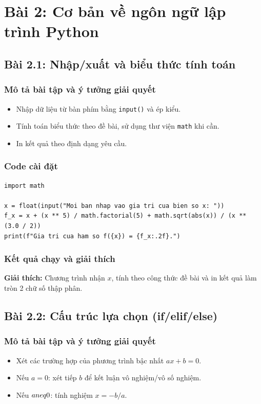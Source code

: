 \chapter{Bài 2: Cơ bản về ngôn ngữ lập trình Python}


\section{Bài 2.1: Nhập/xuất và biểu thức tính toán}
\subsection{Mô tả bài tập và ý tưởng giải quyết}
\begin{itemize}
  \item Nhập dữ liệu từ bàn phím bằng \texttt{input()} và ép kiểu.
  \item Tính toán biểu thức theo đề bài, sử dụng thư viện \texttt{math} khi cần.
  \item In kết quả theo định dạng yêu cầu.
\end{itemize}

\subsection{Code cài đặt}
\begin{lstlisting}
import math

x = float(input("Moi ban nhap vao gia tri cua bien so x: "))
f_x = x + (x ** 5) / math.factorial(5) + math.sqrt(abs(x)) / (x ** (3.0 / 2))
print(f"Gia tri cua ham so f({x}) = {f_x:.2f}.")
\end{lstlisting}

\subsection{Kết quả chạy và giải thích}

\textbf{Giải thích:} Chương trình nhận \(x\), tính theo công thức đề bài và in kết quả làm tròn 2 chữ số thập phân.

\section{Bài 2.2: Cấu trúc lựa chọn (if/elif/else)}
\subsection{Mô tả bài tập và ý tưởng giải quyết}
\begin{itemize}
  \item Xét các trường hợp của phương trình bậc nhất \(ax + b = 0\).
  \item Nếu \(a=0\): xét tiếp \(b\) để kết luận vô nghiệm/vô số nghiệm.
  \item Nếu \(a\\neq0\): tính nghiệm \(x=-b/a\).
\end{itemize}

